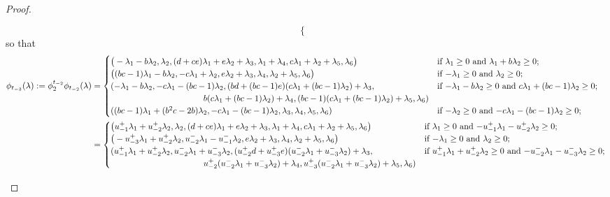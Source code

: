 \documentclass{amsart}
\numberwithin{theorem}{section}
\begin{document}
\begin{proof}
\begin{landscape}
\[\begin{cases}
      \end{cases}
    \]
    so that 
    \begin{align*}
    \phi_{t_{-3}}(\lambda)
      :=\phi^{t_{-2}}_2\phi_{t_{-2}}(\lambda)
      &=
      \begin{cases} 
        \big(-\lambda_1-b\lambda_2,\lambda_2,(d+ce)\lambda_1+e\lambda_2+\lambda_3,\lambda_1+\lambda_4,c\lambda_1+\lambda_2+\lambda_5,\lambda_6\big) & \text{if $\lambda_1 \ge 0$ and $\lambda_1+b\lambda_2 \ge 0$;}\\
        \big((bc-1)\lambda_1-b\lambda_2,-c\lambda_1+\lambda_2,e\lambda_2+\lambda_3,\lambda_4,\lambda_2+\lambda_5,\lambda_6\big) & \text{if $-\lambda_1 \ge 0$ and $\lambda_2 \ge 0$;}\\
        (-\lambda_1-b\lambda_2,-c\lambda_1-(bc-1)\lambda_2,(bd+(bc-1)e)(c\lambda_1+(bc-1)\lambda_2)+\lambda_3, & \text{if $-\lambda_1-b\lambda_2 \ge 0$ and $c\lambda_1+(bc-1)\lambda_2 \ge 0$;}\\
        \hspace{1.5in} b(c\lambda_1+(bc-1)\lambda_2)+\lambda_4,(bc-1)(c\lambda_1+(bc-1)\lambda_2)+\lambda_5,\lambda_6) & \\
        ((bc-1)\lambda_1+(b^2c-2b)\lambda_2,-c\lambda_1-(bc-1)\lambda_2,\lambda_3,\lambda_4,\lambda_5,\lambda_6) & \text{if $-\lambda_2 \ge 0$ and $-c\lambda_1-(bc-1)\lambda_2 \ge 0$;}\\
      \end{cases}\\
      &=
      \begin{cases} 
        \big(u_{-1}^+\lambda_1+u_{-2}^+\lambda_2,\lambda_2,(d+ce)\lambda_1+e\lambda_2+\lambda_3,\lambda_1+\lambda_4,c\lambda_1+\lambda_2+\lambda_5,\lambda_6\big) & \text{if $\lambda_1 \ge 0$ and $-u_{-1}^+\lambda_1-u_{-2}^+\lambda_2 \ge 0$;}\\
        \big(-u_{-3}^+\lambda_1+u_{-2}^+\lambda_2,u_{-2}^-\lambda_1-u_{-1}^-\lambda_2,e\lambda_2+\lambda_3,\lambda_4,\lambda_2+\lambda_5,\lambda_6\big) & \text{if $-\lambda_1 \ge 0$ and $\lambda_2 \ge 0$;}\\
        (u_{-1}^+\lambda_1+u_{-2}^+\lambda_2,u_{-2}^-\lambda_1+u_{-3}^-\lambda_2,(u_{-2}^+d+u_{-3}^+e)(u_{-2}^-\lambda_1+u_{-3}^-\lambda_2)+\lambda_3, & \text{if $u_{-1}^+\lambda_1+u_{-2}^+\lambda_2 \ge 0$ and $-u_{-2}^-\lambda_1-u_{-3}^-\lambda_2 \ge 0$;}\\
        \hspace{1.5in} u_{-2}^+(u_{-2}^-\lambda_1+u_{-3}^-\lambda_2)+\lambda_4,u_{-3}^+(u_{-2}^-\lambda_1+u_{-3}^-\lambda_2)+\lambda_5,\lambda_6) & \\

\end{cases}
\end{align*}
\end{landscape}
\end{proof}
\end{document}
